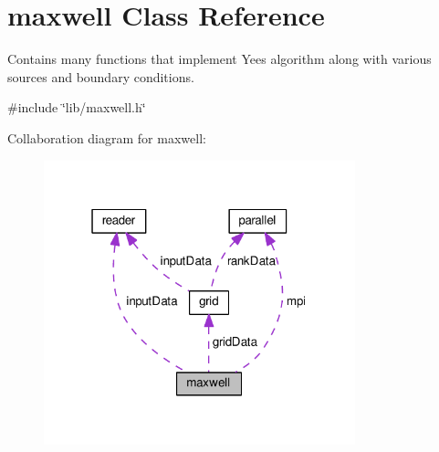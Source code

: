 \hypertarget{classmaxwell}{}\section{maxwell Class Reference}
\label{classmaxwell}


Contains many functions that implement Yee\textquotesingle{}s algorithm along with various sources and boundary conditions.  




{\ttfamily \#include \char`\"{}lib/maxwell.\+h\char`\"{}}



Collaboration diagram for maxwell\+:\nopagebreak
\begin{figure}[H]
\begin{center}
\leavevmode
\includegraphics[width=256pt]{classmaxwell__coll__graph}
\end{center}
\end{figure}
